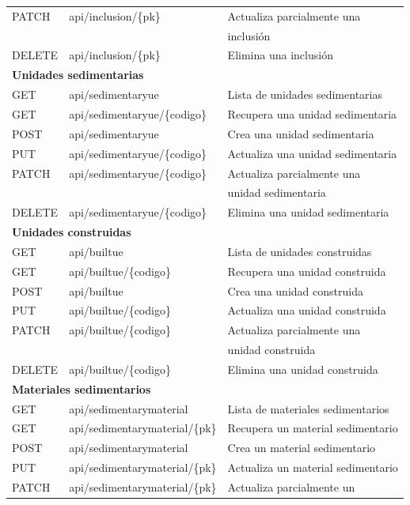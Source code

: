 \begin{longtable}[H]{|l|l|l|}
    PATCH & api/inclusion/\{pk\} & Actualiza parcialmente una \\
    &  & inclusión \\
    DELETE & api/inclusion/\{pk\} & Elimina una inclusión \\
    \hline\hline
    \multicolumn{3}{|l|}{\textbf{Unidades sedimentarias}} \\
    \hline
    GET & api/sedimentaryue & Lista de unidades sedimentarias \\
    GET & api/sedimentaryue/\{codigo\} & Recupera una unidad sedimentaria \\
    POST & api/sedimentaryue & Crea una unidad sedimentaria \\
    PUT & api/sedimentaryue/\{codigo\} & Actualiza una unidad sedimentaria \\
    PATCH & api/sedimentaryue/\{codigo\} & Actualiza parcialmente una \\
    &  & unidad sedimentaria \\
    DELETE & api/sedimentaryue/\{codigo\} & Elimina una unidad sedimentaria \\
    \hline\hline
    \multicolumn{3}{|l|}{\textbf{Unidades construidas}} \\
    \hline
    GET & api/builtue & Lista de unidades construidas \\
    GET & api/builtue/\{codigo\} & Recupera una unidad construida \\
    POST & api/builtue & Crea una unidad construida \\
    PUT & api/builtue/\{codigo\} & Actualiza una unidad construida \\
    PATCH & api/builtue/\{codigo\} & Actualiza parcialmente una \\
    &  & unidad construida \\
    DELETE & api/builtue/\{codigo\} & Elimina una unidad construida \\
    \hline\hline
    \multicolumn{3}{|l|}{\textbf{Materiales sedimentarios}} \\
    \hline
    GET & api/sedimentarymaterial & Lista de materiales sedimentarios \\
    GET & api/sedimentarymaterial/\{pk\} & Recupera un material sedimentario \\
    POST & api/sedimentarymaterial & Crea un material sedimentario \\
    PUT & api/sedimentarymaterial/\{pk\} & Actualiza un material sedimentario \\
    PATCH & api/sedimentarymaterial/\{pk\} & Actualiza parcialmente un \\

\end{longtable}

